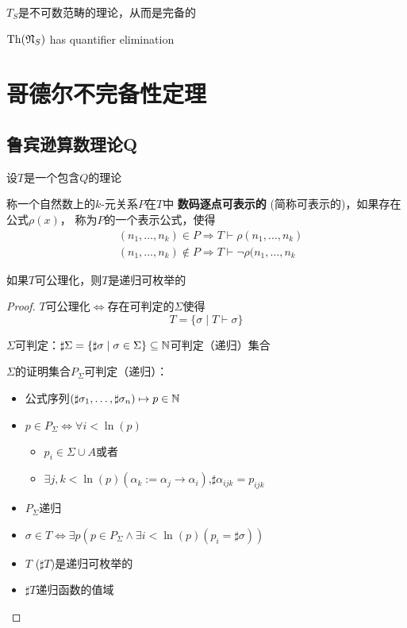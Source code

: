 \documentclass[11pt]{article}
\begin{document}
\begin{lemma}[]
\(T_S\)是不可数范畴的理论，从而是完备的
\end{lemma}

\begin{theorem}[]
\(\operatorname{Th}(\mathfrak{N}_S)\) has quantifier elimination
\end{theorem}

\section{哥德尔不完备性定理}
\label{sec:org6b7dc5e}

\subsection{鲁宾逊算数理论Q}
\label{sec:orgdc2319d}
设\(T\)是一个包含\(Q\)的理论
\begin{definition}[]
称一个自然数上的\(k\)-元关系\(P\)在\(T\)中 \textbf{数码逐点可表示的} (简称可表示的)，如果存在公式\(\rho(x)\)，
称为\(P\)的一个表示公式，使得
\begin{align*}
&(n_1,\dots,n_k)\in P\Rightarrow T\vdash\rho(n_1,\dots,n_k)\\
&(n_1,\dots,n_k)\notin P\Rightarrow T\vdash\neg\rho(n_1,\dots,n_k
\end{align*}
\end{definition}

\begin{lemma}[]
如果\(T\)可公理化，则\(T\)是递归可枚举的
\end{lemma}

\begin{proof}
\(T\)可公理化\(\Leftrightarrow\)存在可判定的\(\Sigma\)使得
\begin{equation*}
T=\{\sigma\mid T\vdash\sigma\}
\end{equation*}

\(\Sigma\)可判定：\(\sharp\Sigma=\{\sharp\sigma\mid\sigma\in\Sigma\}\subseteq\mathbb{N}\)可判定（递归）集合

\(\Sigma\)的证明集合\(P_\Sigma\)可判定（递归）：
\begin{itemize}
\item 公式序列\((\sharp\sigma_1,\dots,\sharp\sigma_n)\mapsto p\in\mathbb{N}\)
\item \(p\in P_\Sigma\Leftrightarrow\forall i<\ln(p)\)
\begin{itemize}
\item \(p_i\in\Sigma\cup A\)或者
\item \(\exists j,k<\ln(p)(\alpha_k:=\alpha_j\to\alpha_i)\),\(\sharp\alpha_{ijk}=p_{ijk}\)
\end{itemize}
\item \(P_\Sigma\)递归
\item \(\sigma\in T\Leftrightarrow\exists p(p\in P_\Sigma\wedge\exists i<\ln(p)(p_i=\sharp\sigma))\)
\item \(T\) (\(\sharp T\))是递归可枚举的
\item \(\sharp T\)递归函数的值域
\end{itemize}
\end{proof}
\end{document}
